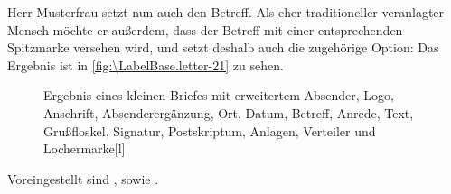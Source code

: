 \begin{Example}
  Herr Musterfrau setzt nun auch den Betreff. %
  \iftrue %
  Als eher traditioneller veranlagter Mensch möchte er %
  \else %
  Er möchte %
  \fi %
  außerdem, dass der Betreff mit einer %
  \iftrue %
  entsprechenden %
  \fi %
  Spitzmarke versehen wird, und setzt deshalb auch die zugehörige Option:%
  Das Ergebnis ist in \autoref{fig:\LabelBase.letter-21} zu sehen.
  \begin{figure}
    \setcapindent{0pt}%
    \begin{captionbeside}{Ergebnis eines kleinen Briefes mit erweitertem Absender,
        Logo, Anschrift, Absenderergänzung, Ort, Datum, Betreff,
        Anrede, Text, Grußfloskel, Signatur, Postskriptum, Anlagen, Verteiler
        und Lochermarke}[l]
    \end{captionbeside}
    \label{fig:\LabelBase.letter-21}
  \end{figure}
\end{Example}
Voreingestellt sind
,  sowie
.%
\EndIndexGroup

